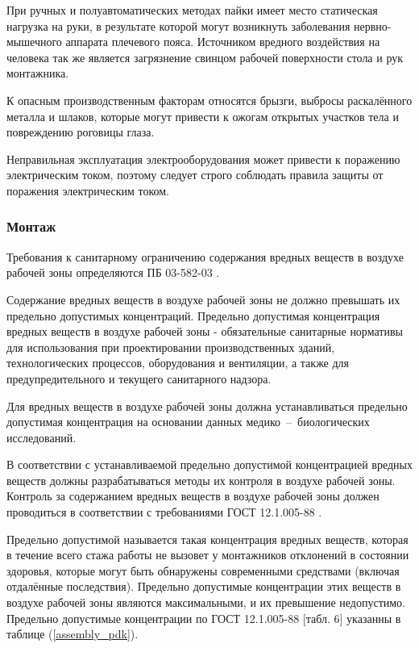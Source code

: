 При ручных и полуавтоматических методах пайки имеет место статическая нагрузка на
руки, в результате которой могут возникнуть заболевания нервно-мышечного аппарата
плечевого пояса. Источником вредного воздействия на человека так же является
загрязнение свинцом рабочей поверхности стола и рук монтажника.

К опасным производственным факторам относятся брызги, выбросы раскалённого
металла и шлаков, которые могут привести к ожогам открытых участков тела и
повреждению роговицы глаза.

Неправильная эксплуатация электрооборудования может привести к поражению
электрическим током, поэтому следует строго соблюдать правила защиты от поражения
электрическим током.

\subsubsection{Монтаж}

Требования к санитарному ограничению содержания вредных веществ в воздухе рабочей
зоны определяются ПБ 03-582-03 \cite{ecology_pb_03_582_03}.

Содержание вредных веществ в воздухе рабочей зоны не должно превышать их
предельно допустимых концентраций. Предельно допустимая концентрация вредных
веществ в воздухе рабочей зоны - обязательные санитарные нормативы для
использования при проектировании производственных зданий, технологических
процессов, оборудования и вентиляции, а также для предупредительного и
текущего санитарного надзора.

Для вредных веществ в воздухе рабочей зоны должна устанавливаться предельно
допустимая концентрация на основании данных медико~--~биологических исследований.

В соответствии с устанавливаемой предельно допустимой концентрацией вредных
веществ должны разрабатываться методы их контроля в воздухе рабочей зоны.
Контроль за содержанием вредных веществ в воздухе рабочей зоны должен проводиться
в соответствии с требованиями ГОСТ 12.1.005-88 \cite{ecology_gost_005_88}.

Предельно допустимой называется такая концентрация вредных веществ, которая в
течение всего стажа работы не вызовет у монтажников отклонений в состоянии
здоровья, которые могут быть обнаружены современными средствами (включая
отдалённые последствия). Предельно допустимые концентрации этих веществ в воздухе
рабочей зоны являются максимальными, и их превышение недопустимо. Предельно
допустимые концентрации по ГОСТ 12.1.005-88 \cite{ecology_gost_005_88}[табл. 6]
указанны в таблице (\ref{assembly_pdk}).

